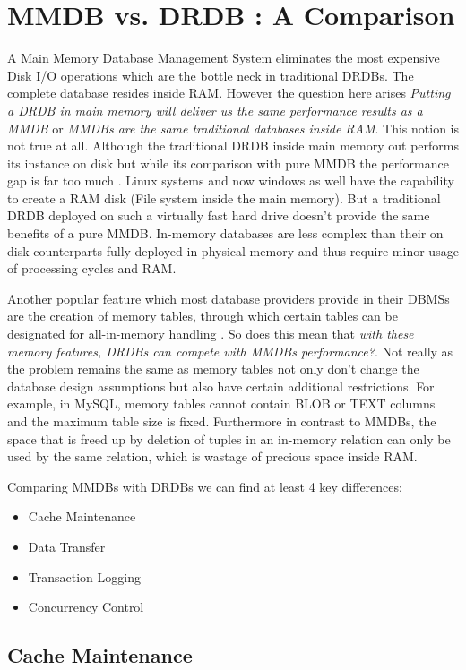 \documentclass[10pt]{article} %
\begin{document}
\section{MMDB vs. DRDB : A Comparison}
A Main Memory Database Management System eliminates the most expensive Disk I/O operations which are the bottle neck in traditional DRDBs. The complete database resides inside RAM. However the question here arises \emph{Putting a DRDB in main memory will deliver us the same performance results as a MMDB} or \emph{MMDBs are the same traditional databases inside RAM}. This notion is not true at all. Although the traditional DRDB inside main memory out performs its instance on disk but while its comparison with pure MMDB the performance gap is far too much \cite{Mcobject-ramdisk}. Linux systems and now windows as well have the capability to create a RAM disk (File system inside the main memory). But a traditional DRDB deployed on such a virtually fast hard drive doesn't provide the same benefits of a pure MMDB. In-memory databases are less complex than their on disk counterparts fully deployed in physical memory and thus require minor usage of processing cycles and RAM.

Another popular feature which most database providers provide in their DBMSs are the creation of memory tables, through which certain tables can be designated for all-in-memory handling \cite{Mcobject-Myths}. So does this mean that \emph{with these memory features, DRDBs can compete with MMDBs performance?}. Not really as the problem remains the same as memory tables not only don't change the database design assumptions but also have certain additional restrictions. For example, in MySQL, memory tables cannot contain BLOB or TEXT columns and the maximum table size is fixed. Furthermore in contrast to MMDBs, the space that is freed up by deletion of tuples in an in-memory relation can only be used by the same relation, which is wastage of precious space inside RAM.

Comparing MMDBs with DRDBs we can find at least 4 key differences:

\begin{itemize}
\item Cache Maintenance
\item Data Transfer
\item Transaction Logging
\item Concurrency Control 
\end{itemize}

\subsection{Cache Maintenance}
\end{document}
